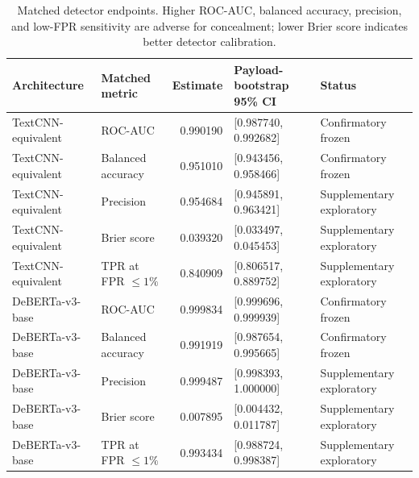 \documentclass[fleqn,10pt]{wlscirep}
\begin{document}
\begin{table}[H]
\centering
\small
\begin{tabularx}{\textwidth}{L{0.24\textwidth}L{0.17\textwidth}r L{0.25\textwidth}Y}
\toprule
Architecture & Matched metric & Estimate & Payload-bootstrap 95\% CI & Status \\
\midrule
TextCNN-equivalent & ROC-AUC & 0.990190 & [0.987740, 0.992682] & Confirmatory frozen \\
TextCNN-equivalent & Balanced accuracy & 0.951010 & [0.943456, 0.958466] & Confirmatory frozen \\
TextCNN-equivalent & Precision & 0.954684 & [0.945891, 0.963421] & Supplementary exploratory \\
TextCNN-equivalent & Brier score & 0.039320 & [0.033497, 0.045453] & Supplementary exploratory \\
TextCNN-equivalent & TPR at FPR \(\leq1\%\) & 0.840909 & [0.806517, 0.889752] & Supplementary exploratory \\
DeBERTa-v3-base & ROC-AUC & 0.999834 & [0.999696, 0.999939] & Confirmatory frozen \\
DeBERTa-v3-base & Balanced accuracy & 0.991919 & [0.987654, 0.995665] & Confirmatory frozen \\
DeBERTa-v3-base & Precision & 0.999487 & [0.998393, 1.000000] & Supplementary exploratory \\
DeBERTa-v3-base & Brier score & 0.007895 & [0.004432, 0.011787] & Supplementary exploratory \\
DeBERTa-v3-base & TPR at FPR \(\leq1\%\) & 0.993434 & [0.988724, 0.998387] & Supplementary exploratory \\
\bottomrule
\end{tabularx}
\caption{\label{tab:detector-matched}Matched detector endpoints. Higher ROC-AUC, balanced accuracy, precision, and low-FPR sensitivity are adverse for concealment; lower Brier score indicates better detector calibration.}
\end{table}
\end{document}
